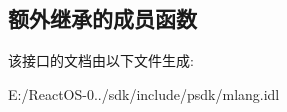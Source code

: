 \subsection*{额外继承的成员函数}


该接口的文档由以下文件生成\+:\begin{DoxyCompactItemize}
\item 
E\+:/\+React\+O\+S-\/0../sdk/include/psdk/mlang.\+idl\end{DoxyCompactItemize}
